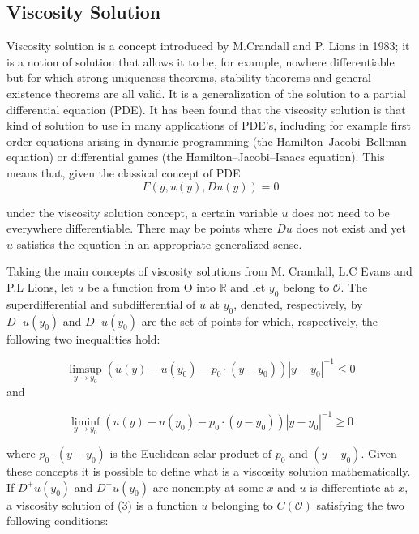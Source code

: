 \subsection{Viscosity Solution}

Viscosity solution is a concept introduced by M.Crandall and P. Lions in 1983; it is a notion of solution that allows it to be, for example, nowhere differentiable but for which strong uniqueness theorems, stability theorems and general existence theorems are all valid. It is a generalization of the solution to a partial differential equation (PDE). It has been found that the viscosity solution is that kind of solution to use in many applications of PDE's, including for example first order equations arising in dynamic programming (the Hamilton–Jacobi–Bellman equation) or differential games (the Hamilton–Jacobi–Isaacs equation). This means that, given the classical concept of PDE 
\begin{equation}
	F(y,u(y), Du(y))=0
\end{equation}

under the viscosity solution concept, a certain variable $u$ does not need to be everywhere differentiable. There may be points where $Du$ does not exist and yet $u$ satisfies the equation in an appropriate generalized sense.

Taking the main concepts of viscosity solutions from M. Crandall, L.C Evans and P.L Lions, let $u$ be a function from O into $\mathbb{R}$  and let $y_0$ belong to $\mathcal{O}$.  The superdifferential and subdifferential of $u$ at $y_0$, denoted, respectively, by $D^{+} u(y_0)$ and $D^{-} u(y_0)$ are the set of points for which, respectively, the following two inequalities hold:

\begin{equation}
	\limsup_{y \to y_0} (u(y)-u(y_0)-p_0 \cdot (y-y_0)) |y-y_0|^{-1} \leq 0
\end{equation}
and

\begin{equation}
	\liminf_{y \to y_0} (u(y)-u(y_0)-p_0 \cdot (y-y_0)) |y-y_0|^{-1} \geq 0
\end{equation}

where $p_0 \cdot (y-y_0)$ is the Euclidean sclar product of $p_0$ and $(y-y_0)$. 
Given these concepts it is possible to define what is a viscosity solution mathematically. 
If $D^+u(y_0)$ and $D^-u(y_0)$ are nonempty at some $x$ and $u$ is differentiate at $x$, a viscosity solution of (3) is a function $u$ belonging to $C(\mathcal{O})$ satisfying the two following conditions:

